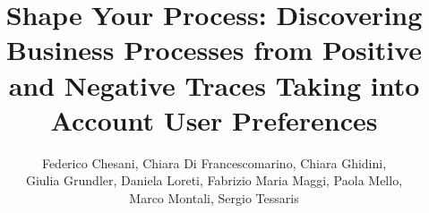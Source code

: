 \documentclass[runningheads]{llncs}
\newcommand\chiara[1]{{\color{blue}{#1}}\xspace}
\begin{document}
%
\title{Shape Your Process: Discovering Business Processes from Positive and Negative Traces Taking into Account \chiara{Expert} User Preferences}

%
%

\author{Federico Chesani, Chiara Di Francescomarino, Chiara Ghidini, \\Giulia Grundler, Daniela Loreti, Fabrizio Maria Maggi, Paola Mello, \\Marco Montali, Sergio Tessaris}
\end{document}

